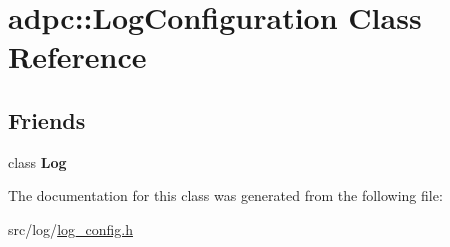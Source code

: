 \hypertarget{classadpc_1_1LogConfiguration}{}\section{adpc\+:\+:Log\+Configuration Class Reference}
\label{classadpc_1_1LogConfiguration}
\subsection*{Friends}
\begin{DoxyCompactItemize}
\item 
\mbox{\label{classadpc_1_1LogConfiguration_acd1b2a0733103b7bbeb76b467ea85446}} 
class {\bfseries Log}
\end{DoxyCompactItemize}


The documentation for this class was generated from the following file\+:\begin{DoxyCompactItemize}
\item 
src/log/\hyperlink{log__config_8h}{log\+\_\+config.\+h}\end{DoxyCompactItemize}
